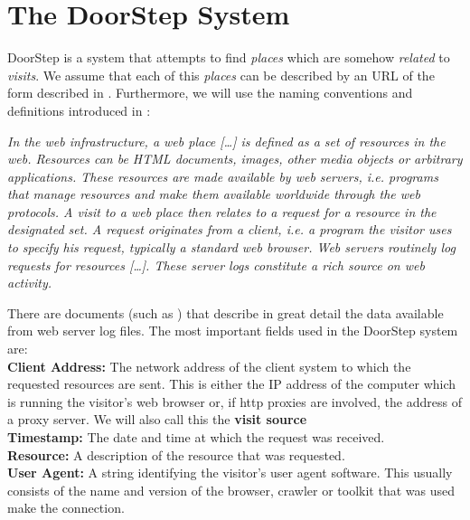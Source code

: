 \documentclass[a4paper]{danarticle}
\theoremstyle{remark}
\begin{document}
  \section{The DoorStep System}
    DoorStep is a system that attempts to find \textit{places} which are somehow
    \textit{related} to \textit{visits}. We assume that each
    of this \textit{places} can be described by an URL of the form described in
    \cite{url}. Furthermore, we will use the naming conventions and definitions
    introduced in \cite{webaware}:
    \begin{center}
    \begin{minipage}{10cm}
    \itshape
    In the web infrastructure, a web place [\dots] is defined as 
    a set of resources in the web. Resources can
    be HTML documents, images, other media objects or arbitrary applications.
    These resources are made available by web servers, i.e. programs that manage
    resources and make them available worldwide through the web protocols. A
    visit to a web place then relates to a request for a resource in the
    designated set. A request originates from a client, i.e. a program the
    visitor uses to specify his request, typically a standard web browser. Web
    servers routinely log requests for resources [\dots]. These server logs
    constitute a rich source on web activity.
    \end{minipage}
    \end{center}
    There are documents (such as \cite{logfile}) that describe in great detail 
    the data available from web server log files. The most important fields used 
    in the DoorStep system are:
    \\
    
    \textbf{Client Address:} The network address of the client system to which 
    the requested resources are sent. This is either the IP address of the 
    computer which is running the visitor's web browser or, if http proxies are 
    involved, the address of a proxy server. We will also call this the 
    \textbf{visit source}
    \\
    
    \textbf{Timestamp:} The date and time at which the request was received.
    \\
    
    \textbf{Resource:} A description of the resource that was requested.
    \\
    
    \textbf{User Agent:} A string identifying the visitor's user agent 
    software. This usually consists of the name and version of the browser, 
    crawler or toolkit that was used make the connection.
    \\
    
\end{document}
